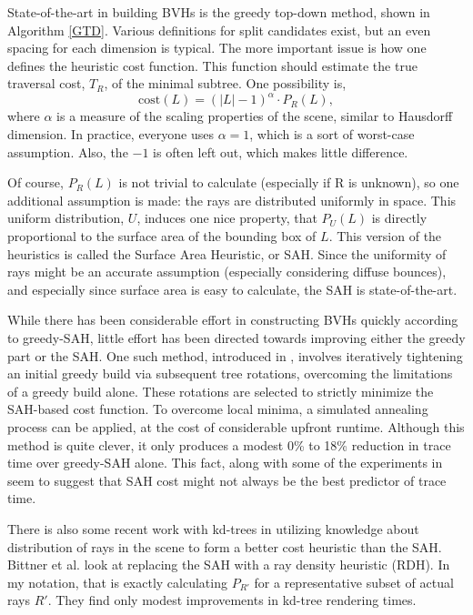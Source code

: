 \documentclass[twocolumn]{article}
\begin{document}
State-of-the-art in building BVHs is the greedy top-down method, shown in Algorithm \ref{GTD}.  Various definitions for split candidates exist, but an even spacing for each dimension is typical. The more important issue is how one defines the heuristic cost function.  This function should estimate the true traversal cost, $T_R$, of the minimal subtree.  One possibility is,
\[\mathrm{cost}(L) = (|L|-1)^\alpha \cdot P_R(L),\]
where $\alpha$ is a measure of the scaling properties of the scene, similar to Hausdorff dimension.  In practice, everyone uses $\alpha=1$, which is a sort of worst-case assumption.  Also, the $-1$ is often left out, which makes little difference.

Of course, $P_R(L)$ is not trivial to calculate (especially if R is unknown), so one additional assumption is made: the rays are distributed uniformly in space.  This uniform distribution, $U$, induces one nice property, that $P_U(L)$ is directly proportional to the surface area of the bounding box of $L$.  This version of the heuristics is called the Surface Area Heuristic, or SAH.  Since the uniformity of rays might be an accurate assumption (especially considering diffuse bounces), and especially since surface area is easy to calculate, the SAH is state-of-the-art.  

While there has been considerable effort in constructing BVHs quickly according to greedy-SAH, little effort has been directed towards improving either the greedy part or the SAH.  One such method, introduced in \cite{Kensler08}, involves iteratively tightening an initial greedy build via subsequent tree rotations, overcoming the limitations of a greedy build alone.  These rotations are selected to strictly minimize the SAH-based cost function.  To overcome local minima, a simulated annealing process can be applied, at the cost of considerable upfront runtime.  Although this method is quite clever, it only produces a modest 0\% to 18\% reduction in trace time over greedy-SAH alone.  This fact, along with some of the experiments in \cite{Kensler08} seem to suggest that SAH cost might not always be the best predictor of trace time.

There is also some recent work with kd-trees in utilizing knowledge about distribution of rays in the scene to form a better cost heuristic than the SAH.  Bittner et al. \cite{Bittner09} look at replacing the SAH with a ray density heuristic (RDH).  In my notation, that is exactly calculating $P_{R'}$ for a representative subset of actual rays $R'$.  They find only modest improvements in kd-tree rendering times.  
\end{document}
